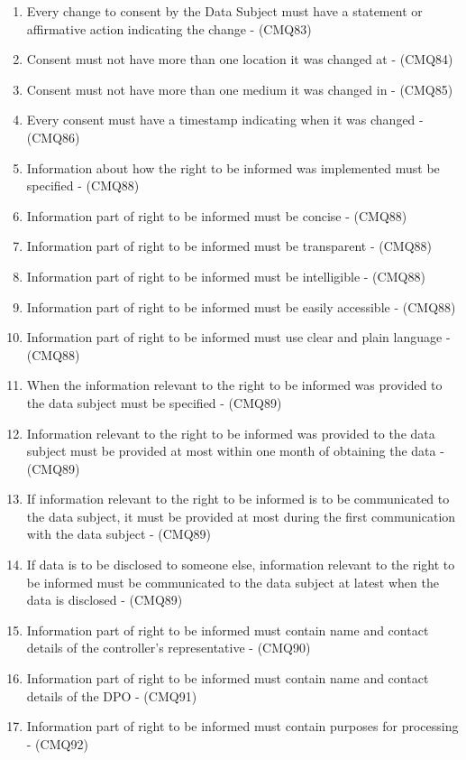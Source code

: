 \begin{enumerate}[label={\textit{C.\theenumi}}]
    \item Every change to consent by the Data Subject must have a statement or affirmative action indicating the change - (CMQ83)
    \item Consent must not have more than one location it was changed at - (CMQ84)
    \item Consent must not have more than one medium it was changed in - (CMQ85)
    \item Every consent must have a timestamp indicating when it was changed - (CMQ86)
    \item Information about how the right to be informed was implemented must be specified - (CMQ88)
    \item Information part of right to be informed must be concise - (CMQ88)
    \item Information part of right to be informed must be transparent - (CMQ88)
    \item Information part of right to be informed must be intelligible - (CMQ88)
    \item Information part of right to be informed must be easily accessible - (CMQ88)
    \item Information part of right to be informed must use clear and plain language - (CMQ88)
    \item When the information relevant to the right to be informed was provided to the data subject must be specified - (CMQ89)
    \item Information relevant to the right to be informed was provided to the data subject must be provided at most within one month of obtaining the data - (CMQ89)
    \item If information relevant to the right to be informed is to be communicated to the data subject, it must be provided at most during the first communication with the data subject - (CMQ89)
    \item If data is to be disclosed to someone else, information relevant to the right to be informed must be communicated to the data subject at latest when the data is disclosed - (CMQ89)
    \item Information part of right to be informed must contain name and contact details of the controller’s representative - (CMQ90)
    \item Information part of right to be informed must contain name and contact details of the DPO - (CMQ91)
    \item Information part of right to be informed must contain purposes for processing - (CMQ92)

\end{enumerate}
